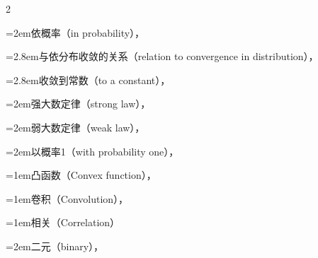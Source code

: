 \begin{multicols}{2}
\par\noindent\hangindent=2em\hspace*{1em}\label{idx:206}依概率（in probability），\hyperref[def:5.5.1]{\pageref*{def:5.5.1}}\par
\par\noindent\hangindent=2.8em\hspace*{1.8em}\label{idx:207}与依分布收敛的关系（relation to convergence in distribution），\hyperref[thm:5.5.12]{\pageref*{thm:5.5.12}}\par
\par\noindent\hangindent=2.8em\hspace*{1.8em}\label{idx:208}收敛到常数（to a constant），\hyperref[thm:5.5.13]{\pageref*{thm:5.5.13}}\par
\par\noindent\hangindent=2em\hspace*{1em}\label{idx:209}强大数定律（strong law），\hyperref[thm:5.5.9]{\pageref*{thm:5.5.9}}\par
\par\noindent\hangindent=2em\hspace*{1em}\label{idx:210}弱大数定律（weak law），\hyperref[thm:5.5.2]{\pageref*{thm:5.5.2}}\par
\par\noindent\hangindent=2em\hspace*{1em}\label{idx:211}以概率1（with probability one），\hyperref[def:5.5.6]{\pageref*{def:5.5.6}}\par
\par\addvspace{2pt}
\par\noindent\hangindent=1em\hspace*{0em}\label{idx:212}凸函数（Convex function），\hyperref[def:4.7.6]{\pageref*{def:4.7.6}}\par
\par\addvspace{2pt}
\par\noindent\hangindent=1em\hspace*{0em}\label{idx:213}卷积（Convolution），\hyperref[thm:5.2.9]{\pageref*{thm:5.2.9}}\par
\par\addvspace{2pt}
\par\noindent\hangindent=1em\hspace*{0em}\label{idx:214}相关（Correlation）\par
\par\noindent\hangindent=2em\hspace*{1em}\label{idx:215}二元（binary），\hyperref[exercise:5.57]{\pageref*{exercise:5.57}}\par

\end{multicols}
